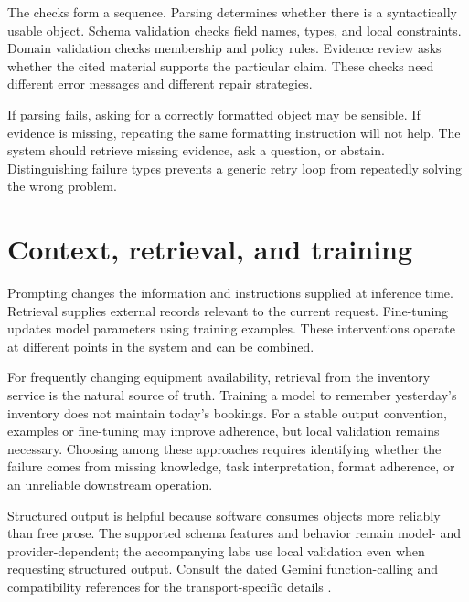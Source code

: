 The checks form a sequence. Parsing determines whether there is a syntactically usable object. Schema validation checks field names, types, and local constraints. Domain validation checks membership and policy rules. Evidence review asks whether the cited material supports the particular claim. These checks need different error messages and different repair strategies.

If parsing fails, asking for a correctly formatted object may be sensible. If evidence is missing, repeating the same formatting instruction will not help. The system should retrieve missing evidence, ask a question, or abstain. Distinguishing failure types prevents a generic retry loop from repeatedly solving the wrong problem.

\section{Context, retrieval, and training}
Prompting changes the information and instructions supplied at inference time. Retrieval supplies external records relevant to the current request. Fine-tuning updates model parameters using training examples. These interventions operate at different points in the system and can be combined.

For frequently changing equipment availability, retrieval from the inventory service is the natural source of truth. Training a model to remember yesterday's inventory does not maintain today's bookings. For a stable output convention, examples or fine-tuning may improve adherence, but local validation remains necessary. Choosing among these approaches requires identifying whether the failure comes from missing knowledge, task interpretation, format adherence, or an unreliable downstream operation.

Structured output is helpful because software consumes objects more reliably than free prose. The supported schema features and behavior remain model- and provider-dependent; the accompanying labs use local validation even when requesting structured output. Consult the dated Gemini function-calling and compatibility references for the transport-specific details \cite{gemini-tools,gemini-openai}.

